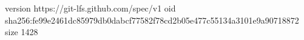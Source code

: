 version https://git-lfs.github.com/spec/v1
oid sha256:fe99e2461dc85979db0dabcf77582f78cd2b05e477c55134a3101e9a90718872
size 1428
